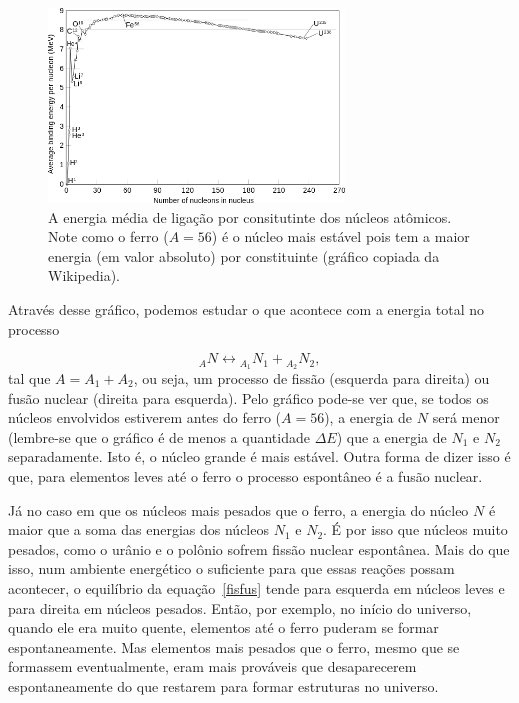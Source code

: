 \documentclass{article}
\begin{document}
\begin{figure}[ht]
\begin{center}
\includegraphics[width=0.7\textwidth]{binding_energy.png}
\caption{\label{fig:bind_ener}A energia m\'edia de liga\c c\~ao por consitutinte dos n\'ucleos at\^omicos. Note como o ferro ($A=56$) \'e o n\'ucleo mais est\'avel pois tem a maior energia (em valor absoluto) por constituinte (gr\'afico copiada da Wikipedia).}
\end{center}
\end{figure}
Atrav\'es desse gr\'afico, podemos estudar o que acontece com a energia total no processo

\begin{equation}\label{fisfus}
{}_AN \leftrightarrow {}_{A_1}N_1 + {}_{A_2}N_2,
\end{equation}
tal que $A = A_1 + A_2$, ou seja, um processo de fiss\~ao (esquerda para direita) ou fus\~ao nuclear (direita para esquerda). Pelo gr\'afico pode-se ver que, se todos os n\'ucleos envolvidos estiverem antes do ferro ($A=56$), a energia de $N$ ser\'a menor (lembre-se que o gr\'afico \'e de menos a quantidade $\Delta E$) que a energia de $N_1$ e $N_2$ separadamente. Isto \'e, o n\'ucleo grande \'e mais est\'avel. Outra forma de dizer isso \'e que, para elementos leves at\'e o ferro o processo espont\^aneo \'e a fus\~ao nuclear.

J\'a no caso em que os n\'ucleos mais pesados que o ferro, a energia do n\'ucleo $N$ \'e maior que a soma das energias dos n\'ucleos $N_1$ e $N_2$. \'E por isso que n\'ucleos muito pesados, como o ur\^anio e o pol\^onio sofrem fiss\~ao nuclear espont\^anea. Mais do que isso, num ambiente energ\'etico o suficiente para que essas rea\c c\~oes possam acontecer, o equil\'ibrio da equa\c c\~ao~\eqref{fisfus} tende para esquerda em n\'ucleos leves e para direita em n\'ucleos pesados. Ent\~ao, por exemplo, no in\'icio do universo, quando ele era muito quente, elementos at\'e o ferro puderam se formar espontaneamente. Mas elementos mais pesados que o ferro, mesmo que se formassem eventualmente, eram mais prov\'aveis que desaparecerem espontaneamente do que restarem para formar estruturas no universo.
\end{document}
